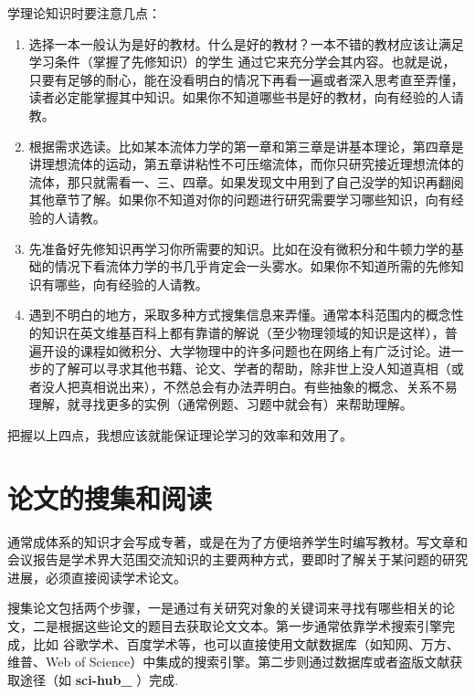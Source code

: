 \documentclass[a4paper,10pt,english]{sphinxmanual}
\begin{document}
学理论知识时要注意几点：
\begin{enumerate}
\item {} 
选择一本一般认为是好的教材。什么是好的教材？一本不错的教材应该让满足学习条件（掌握了先修知识）的学生  通过它来充分学会其内容。也就是说，只要有足够的耐心，能在没看明白的情况下再看一遍或者深入思考直至弄懂，读者必定能掌握其中知识。如果你不知道哪些书是好的教材，向有经验的人请教。

\item {} 
根据需求选读。比如某本流体力学的第一章和第三章是讲基本理论，第四章是讲理想流体的运动，第五章讲粘性不可压缩流体，而你只研究接近理想流体的流体，那只就需看一、三、四章。如果发现文中用到了自己没学的知识再翻阅其他章节了解。如果你不知道对你的问题进行研究需要学习哪些知识，向有经验的人请教。

\item {} 
先准备好先修知识再学习你所需要的知识。比如在没有微积分和牛顿力学的基础的情况下看流体力学的书几乎肯定会一头雾水。如果你不知道所需的先修知识有哪些，向有经验的人请教。

\item {} 
遇到不明白的地方，采取多种方式搜集信息来弄懂。通常本科范围内的概念性的知识在英文维基百科上都有靠谱的解说（至少物理领域的知识是这样），普遍开设的课程如微积分、大学物理中的许多问题也在网络上有广泛讨论。进一步的了解可以寻求其他书籍、论文、学者的帮助，除非世上没人知道真相（或者没人把真相说出来），不然总会有办法弄明白。有些抽象的概念、关系不易理解，就寻找更多的实例（通常例题、习题中就会有）来帮助理解。

\end{enumerate}

把握以上四点，我想应该就能保证理论学习的效率和效用了。


\section{论文的搜集和阅读}
\label{\detokenize{4. GetInfo:id3}}
通常成体系的知识才会写成专著，或是在为了方便培养学生时编写教材。写文章和会议报告是学术界大范围交流知识的主要两种方式，要即时了解关于某问题的研究进展，必须直接阅读学术论文。

搜集论文包括两个步骤，一是通过有关研究对象的关键词来寻找有哪些相关的论文，二是根据这些论文的题目去获取论文文本。第一步通常依靠学术搜索引擎完成，比如 谷歌学术、百度学术等，也可以直接使用文献数据库（如知网、万方、维普、Web of Science）中集成的搜索引擎。第二步则通过数据库或者盗版文献获取途径（如 {\color{red}\bfseries{}sci-hub\_} ）完成.
\end{document}
